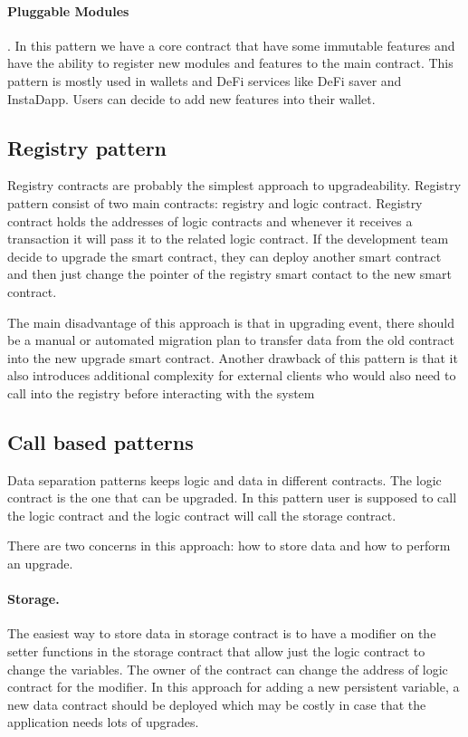 \paragraph{Pluggable Modules}. In this pattern we have a core contract that have some immutable features and have the ability to register new modules and features to the main contract. This pattern is mostly used in wallets and DeFi services like DeFi saver and InstaDapp. Users can decide to add new features into their wallet. 

\subsection{Registry pattern}
Registry contracts are probably the simplest approach to upgradeability. Registry pattern consist of two main contracts: registry and logic contract. Registry contract holds the addresses of logic contracts and whenever it receives a transaction it will pass it to the related logic contract. 
If the development team decide to upgrade the smart contract, they can deploy another smart contract and then just change the pointer of the registry smart contact to the new smart contract.

The main disadvantage of this approach is that in upgrading event, there should be a manual or automated migration plan to transfer data from the old contract into the new upgrade smart contract.
Another drawback of this pattern is that it also introduces additional complexity for external clients who would also need to call into the registry before interacting with the system

\subsection{Call based patterns}

Data separation patterns keeps logic and data in different contracts. The logic contract is the one that can be upgraded. In this pattern user is supposed to call the logic contract and the logic contract will call the storage contract.

There are two concerns in this approach: how to store data and how to perform an upgrade.

\paragraph{Storage. }The easiest way to store data in storage contract is to have a modifier on the setter functions in the storage contract that allow just the logic contract to change the variables. The owner of the contract can change the address of logic contract for the modifier.
In this approach for adding a new persistent variable, a new data contract should be deployed which may be costly in case that the application needs lots of upgrades.

